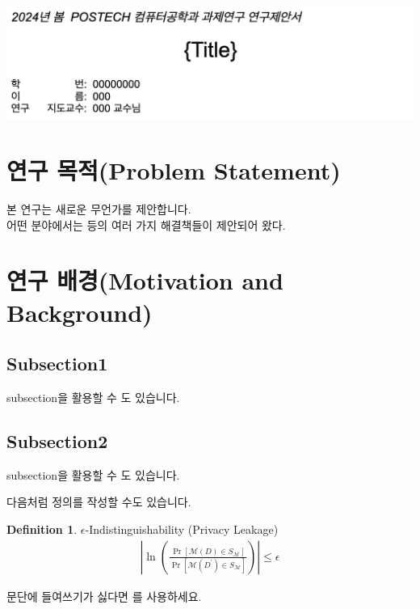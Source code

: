 \documentclass[a4paper,11pt]{article}
\theoremstyle{definition}
\newtheorem{definition}{Definition}
\begin{document}
\begin{center}
    \includegraphics[width=\textwidth]{title.png}
\end{center}


\section{연구 목적(Problem Statement)} %
본 연구는 새로운 무언가를 제안합니다. \vspace{2mm} \\ 
어떤 분야에서는 \cite{} 등의 여러 가지 해결책들이 제안되어 왔다. 

\section{연구 배경(Motivation and Background)} %
\subsection{Subsection1}
subsection을 활용할 수 도 있습니다.
\subsection{Subsection2}
subsection을 활용할 수 도 있습니다.

다음처럼 정의를 작성할 수도 있습니다. 
\begin{definition}$\epsilon$-Indistinguishability (Privacy Leakage)
\begin{align*}
    \left| \ln( \frac{\Pr[\mathcal{M}(D) \in S_\mathcal{M}]}{\Pr[\mathcal{M}(D^{'}) \in S_\mathcal{M}]} ) \right| \leq \epsilon
\end{align*}
\end{definition}

문단에 들여쓰기가 싫다면 \noindent 를 사용하세요.
\end{document}
